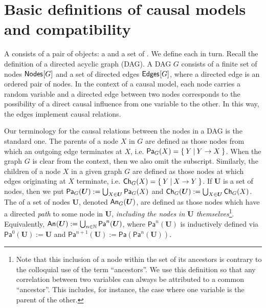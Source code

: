 \section{Basic definitions of causal models and compatibility}\label{sec:definitions}

A  consists of a pair of objects: a  and a set of .  We define each in turn. 
Recall the definition of a directed acyclic graph (DAG). A DAG $G$ consists of a finite set of nodes $\nodes{G}$ and a set of directed edges $\edges{G}$, where a directed edge is an ordered pair of nodes. 
 In the context of a causal model, each node carries a random variable and a directed edge between two nodes corresponds to the possibility of a direct causal influence from one variable to the other. In this way, the edges implement causal relations.

Our terminology for the causal relations between the nodes in a DAG is the standard one. The parents of a node $X$ in $G$ are defined as those nodes from which an outgoing edge terminates at $X$, i.e. $\Pa[G]{X} = \{\:Y\:|\:Y\to X\:\}$. When the graph $G$ is clear from the context, then we also omit the subscript. Similarly, the children of a node $X$ in a given graph $G$ are defined as those nodes at which edges originating at $X$ terminate, i.e. $\Ch[G]{X} = \{\:Y\:|\: X\to Y\:\}$. If $\bm{U}$ is a set of nodes, then we put $\Pa[G]{\bm{U}} := \bigcup_{X\in\bm{U}} \Pa[G]{X}$ and $\Ch[G]{\bm{U}} := \bigcup_{X\in\bm{U}} \Ch[G]{X}$. The  of a set of nodes $\bm{U}$, denoted $\An[G]{\bm{U}}$, are defined as those nodes which have a directed \emph{path} to some node in $\bm{U}$, \emph{including the nodes in $\bm{U}$ themselves}\footnote{Note that this inclusion of a node within the set of its ancestors is contrary to the colloquial use of the term ``ancestors''. 
We use this definition so that any correlation between two variables can always be attributed to a common ``ancestor''. This includes, for instance, the case where one variable is the parent of the other.
}. 
Equivalently, $\An{\bm{U}} := \bigcup_{n\in\mathbb{N}} \mathsf{Pa}^n(\bm{U})$, where $\mathsf{Pa}^n(\bm{U})$ is inductively defined via $\mathsf{Pa}^0(\bm{U}) := \bm{U}$ and $\mathsf{Pa}^{n+1}(\bm{U}) := \mathsf{Pa}(\mathsf{Pa}^n(\bm{U}))$. 

